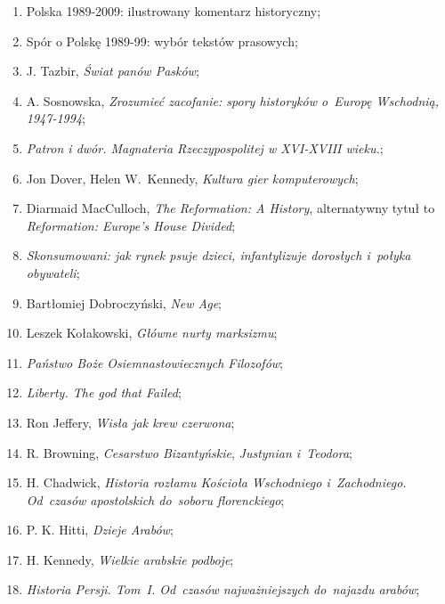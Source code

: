 \documentclass[a4paper,11pt]{article}
\begin{document}
\begin{enumerate}
\item Polska 1989-2009: ilustrowany komentarz historyczny;

\item Spór o Polskę 1989-99: wybór tekstów prasowych;

\item J. Tazbir, \emph{Świat panów Pasków};

\item A. Sosnowska, \emph{Zrozumieć zacofanie: spory historyków
    o~Europę Wschodnią, 1947-1994};

\item \emph{Patron i dwór. Magnateria Rzeczypospolitej w XVI-XVIII
    wieku.};

\item Jon Dover, Helen W.~Kennedy, \emph{Kultura gier komputerowych};

\item Diarmaid MacCulloch, \emph{The Reformation: A History},
  alternatywny tytuł to \emph{Reformation: Europe's House Divided};

\item \emph{Skonsumowani: jak rynek psuje dzieci, infantylizuje
    dorosłych i~połyka obywateli};

\item Bartłomiej Dobroczyński, \emph{New Age};

\item Leszek Kołakowski, \emph{Główne nurty marksizmu};

\item \emph{Państwo Boże Osiemnastowiecznych Filozofów};

\item \emph{Liberty. The god that Failed};

\item Ron Jeffery, \emph{Wisła jak krew czerwona};

\item R. Browning, \emph{Cesarstwo Bizantyńskie}, \emph{Justynian
    i~Teodora};

\item H. Chadwick, \emph{Historia rozłamu Kościoła Wschodniego
    i~Zachodniego. Od~czasów apostolskich do~soboru florenckiego};

\item P. K. Hitti, \emph{Dzieje Arabów};

\item H. Kennedy, \emph{Wielkie arabskie podboje};

\item \emph{Historia Persji. Tom~I. Od~czasów najważniejszych
    do~najazdu arabów};


\end{enumerate}
\end{document}
